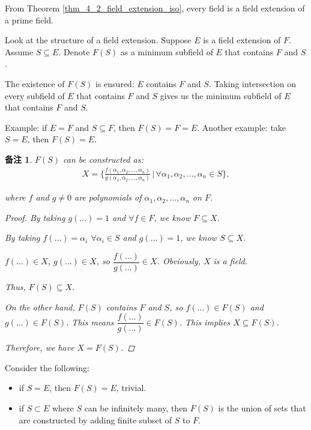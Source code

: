 \documentclass[utf8]{ctexbook}
\newtheorem{memo}{备注}[section]
\begin{document}
From Theorem \ref{thm_4_2_field_extension_iso}, every field is a field extension of a prime field.

Look at the structure of a field extension. Suppose $E$ is a field extension of $F$. Assume $S \subseteq E$. Denote $F(S)$ as a minimum subfield of $E$ that contains $F$ and $S$.

The existence of $F(S)$ is ensured: $E$ contains $F$ and $S$. Taking intersection on every subfield of $E$ that contains $F$ and $S$ gives us the minimum subfield of $E$ that contains $F$ and $S$. 

Example: if $E=F$ and $S \subseteq F$, then $F(S)=F=E$. Another example: take $S=E$, then $F(S)=E$.

\begin{memo}\label{memo_constructive_field_extension}
$F(S)$ can be constructed as:
\begin{align*}
X = \big\{ \frac{f(\alpha_1, \alpha_2, \ldots, \alpha_n)}{g(\alpha_1, \alpha_2, \ldots, \alpha_n)} \, | \, \forall \alpha_1, \alpha_2, \ldots, \alpha_n \in S \big\},
\end{align*}

where $f$ and $g \neq 0$ are polynomials of $\alpha_1, \alpha_2, \ldots, \alpha_n$ on $F$. 

\begin{proof}
By taking $g(\ldots)=1$ and $\forall f \in F$, we know $F \subseteq X$.

By taking $f(\ldots) = \alpha_i$ $\forall \alpha_i \in S$ and $g(\ldots)=1$, we know $S \subseteq X$.

$f(\ldots) \in X$, $g(\ldots) \in X$, so $\dfrac{f(\ldots)}{g(\ldots)} \in X$. Obviously, $X $ is a field. 

Thus, $F(S) \subseteq X$.

On the other hand, $F(S)$ contains $F$ and $S$, so $f(\ldots) \in F(S)$ and $g(\ldots) \in F(S)$. This means $\dfrac{f(\ldots)}{g(\ldots)} \in F(S)$. This implies $X \subseteq F(S)$.

Therefore, we have $X = F(S)$.

\end{proof}

\end{memo}

Consider the following:
\begin{itemize}
\item{if $S =E$, then $F(S)=E$, trivial.}
\item{if $S \subset E$ where $S$ can be infinitely many, then $F(S)$ is the union of sets that are constructed by adding finite subset of $S$ to $F$.}
\end{itemize}
\end{document}
